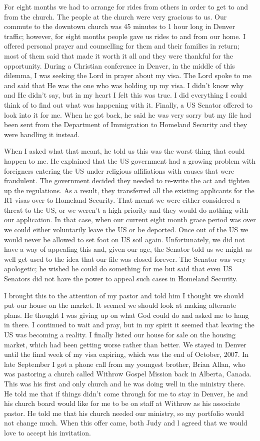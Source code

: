 \documentclass[oneside,12pt]{book}
\begin{document}
For eight months we had to arrange for rides from others in order to get to and from the church.  The people at the church were very gracious to us. Our commute to the downtown church was 45 minutes to 1 hour long in Denver traffic; however, for eight months people gave us rides to and from our home. I offered personal prayer and counselling for them and their families in return; most of them said that made it worth it all and they were thankful for the opportunity. During a Christian conference in Denver, in the middle of this dilemma, I was seeking the Lord in prayer about my visa. The Lord spoke to me and said that He was the one who was holding up my visa. I didn't know why and He didn't say, but in my heart I felt this was true. I did everything I could think of to find out what was happening with it. Finally, a US Senator offered to look into it for me. When he got back, he said he was very sorry but my file had been sent from the Department of Immigration to Homeland Security and they were handling it instead.
 
When I asked what that meant, he told us this was the worst thing that could happen to me. He explained that the US government had a growing problem with foreigners entering the US under religious affiliations with causes that were fraudulent. The government decided they needed to re-write the act and tighten up the regulations. As a result, they transferred all the existing applicants for the R1 visas over to Homeland Security. That meant we were either considered  a threat to the US, or we weren't a high priority and they would do nothing with our application. In that case, when our current eight month grace period was over we could either voluntarily leave the US or be deported. Once out of the US we would never be allowed to set foot on US soil again. Unfortunately, we did not have a way of appealing this and, given our age, the Senator told us we might as well get used to the idea that our file was closed forever. The Senator was very apologetic; he wished he could do something for me but said that even US Senators did not have the power to appeal such cases in Homeland Security.

I brought this to the attention of my pastor and told him I thought we should put our house on the market. It seemed we should look at making alternate plans. He thought I was giving up on what God could do and asked me to hang in there. I continued to wait and pray, but in my spirit it seemed that leaving the US was becoming a reality. I finally listed our house for sale on the housing market, which had been getting worse rather than better. We stayed in Denver until the final week of my visa expiring, which was the end of October, 2007. In late September I got a phone call from my youngest brother, Brian Allan, who was pastoring a church called Withrow Gospel Mission back in Alberta, Canada. This was his first and only church and he was doing well in the ministry there. He told me that if things didn't come through for me to stay in Denver, he and his church board would like for me to be on staff at Withrow as his associate pastor. He told me that his church needed our ministry, so my portfolio would not change much. When this offer came, both Judy and l agreed that we would love to accept his invitation.
\end{document}
